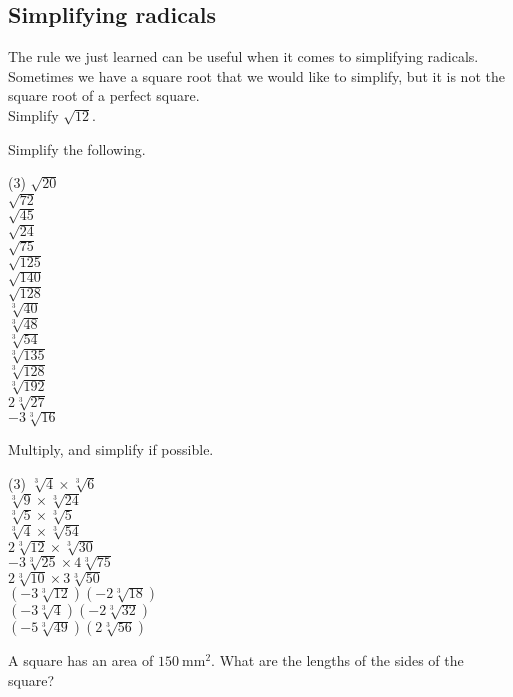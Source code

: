 \documentclass[12pt,fleqn]{book}
\newcommand{\prb}[1]{\begin{Exercise}#1\end{Exercise}}
\begin{document}
\subsection*{Simplifying radicals}
The rule we just learned can be useful when it comes to simplifying radicals.  Sometimes we have a square root that we would like to simplify, but it is not the square root of a perfect square.  
\\[1em]
Simplify $\sqrt{12}$.
\\[2in]
\prb{
Simplify the following.
\begin{tasks}(3)
\task $\sqrt{20}$
\\[1in]
\task $\sqrt{72}$
\\[1in]
\task $\sqrt{45}$
\\[1in]
\task $\sqrt{24}$
\\[1in]
\task $\sqrt{75}$
\\[1in]
\task $\sqrt{125}$
\\[1in]
\task $\sqrt{140}$
\\[1in]
\task $\sqrt{128}$
\\[1in]
\task $\sqrt[3]{40}$
\\[1in]
\task $\sqrt[3]{48}$
\\[1in]
\task $\sqrt[3]{54}$
\\[1in]
\task $\sqrt[3]{135}$
\\[1in]
\task $\sqrt[3]{128}$
\\[1in]
\task $\sqrt[3]{192}$
\\[1in]
\task $2 \sqrt[3]{27}$
\\[1in]
\task $-3 \sqrt[3]{16}$
\\[1in]
\end{tasks}
}
\prb{
Multiply, and simplify if possible.
\begin{tasks}(3)
\task $\sqrt[3]{4} \times \sqrt[3]{6}$
\\[2in]
\task $\sqrt[3]{9} \times \sqrt[3]{24}$
\\[2in]
\task $\sqrt[3]{5} \times \sqrt[3]{5}$
\\[2in]
\task $\sqrt[3]{4} \times \sqrt[3]{54}$
\\[2in]
\task $2 \sqrt[3]{12} \times \sqrt[3]{30}$
\\[2in]
\task $-3 \sqrt[3]{25} \times 4 \sqrt[3]{75}$
\\[2in]
\task $2 \sqrt[3]{10} \times 3 \sqrt[3]{50}$
\\[2in]
\task $(-3 \sqrt[3]{12})(-2 \sqrt[3]{18})$
\\[2in]
\task $(-3 \sqrt[3]{4})(-2 \sqrt[3]{32})$
\\[2in]
\task $(-5 \sqrt[3]{49})(2 \sqrt[3]{56})$
\\[2in]
\end{tasks}
}
\prb{
A square has an area of $150 \mathrm{~mm}^2$. What are the lengths of the sides of the square?
}
\end{document}
